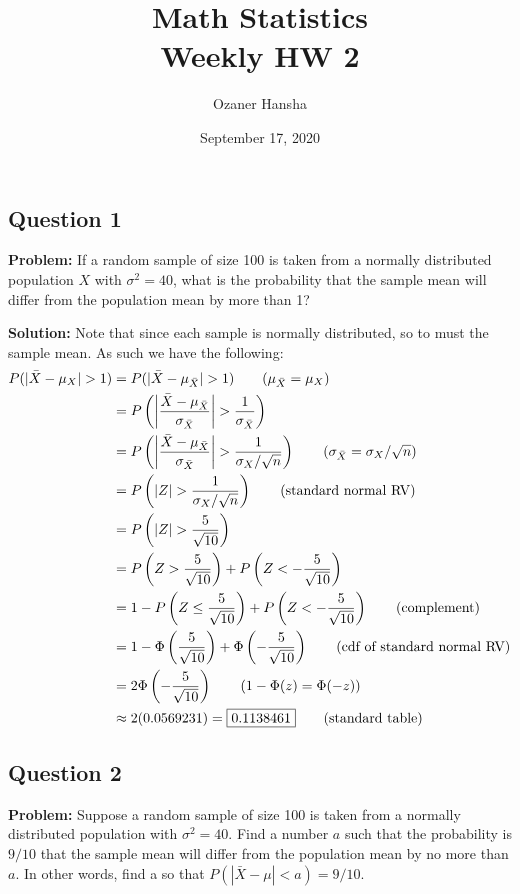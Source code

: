 \documentclass{article}
\begin{document}
\title{Math Statistics\\ Weekly HW 2}
\author{Ozaner Hansha}
\date{September 17, 2020}
\maketitle

\subsection*{Question 1}
\noindent\textbf{Problem:}  If a random sample of size 100 is taken from a normally distributed population $X$ with $\sigma^2 = 40$, what is the probability that the sample mean will differ from the population mean by more than 1?
\bigskip

\noindent\textbf{Solution:} Note that since each sample is normally distributed, so to must the sample mean. As such we have the following:
\begin{align*}
  P(|\bar{X}-\mu_X|>1)&=P(|\bar{X}-\mu_{\bar{X}}|>1)\tag{$\mu_{\bar{X}}=\mu_X$}\\
  &=P\left(\left|\frac{\bar{X}-\mu_{\bar{X}}}{\sigma_{\bar{X}}}\right|>\frac{1}{\sigma_{\bar{X}}}\right)\\
  &=P\left(\left|\frac{\bar{X}-\mu_{\bar{X}}}{\sigma_{\bar{X}}}\right|>\frac{1}{\sigma_X/\sqrt{n}}\right)\tag{$\sigma_{\bar{X}}=\sigma_X/\sqrt{n}$}\\
  &=P\left(\left|Z\right|>\frac{1}{\sigma_X/\sqrt{n}}\right)\tag{standard normal RV}\\
  &=P\left(\left|Z\right|>\frac{5}{\sqrt{10}}\right)\\
  &=P\left(Z>\frac{5}{\sqrt{10}}\right)+P\left(Z<-\frac{5}{\sqrt{10}}\right)\\
  &=1-P\left(Z\le\frac{5}{\sqrt{10}}\right)+P\left(Z<-\frac{5}{\sqrt{10}}\right)\tag{complement}\\
  &=1-\Phi\left(\frac{5}{\sqrt{10}}\right)+\Phi\left(-\frac{5}{\sqrt{10}}\right)\tag{cdf of standard normal RV}\\
  &=2\Phi\left(-\frac{5}{\sqrt{10}}\right)\tag{$1-\Phi(z)=\Phi(-z)$}\\
  &\approx2(0.0569231)=\boxed{0.1138461}\tag{standard table}
\end{align*}
\smallskip

\newpage
\subsection*{Question 2}
\noindent\textbf{Problem:} Suppose a random sample of size 100 is taken from a normally distributed population with $\sigma^2 = 40$. Find a number $a$ such that the probability is $9/10$ that the sample mean will differ from the population mean by no more than $a$. In other words, find a so that $P(|\bar X-\mu|<a)=9/10$.
\bigskip
\end{document}
